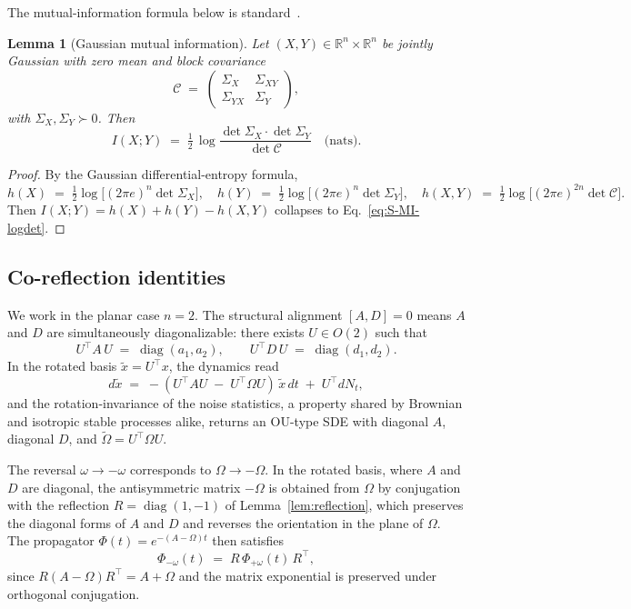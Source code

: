 \documentclass[%
 reprint,
 superscriptaddress,
 nofootinbib,
 nobibnotes,
 amsmath,amssymb,
 aps,
 prl,
 floatfix,
]{revtex4-2}
\newcommand{\RR}{\mathbb{R}}
\DeclareMathOperator{\diag}{diag}
\newtheorem{lemma}{Lemma}
\begin{document}
The mutual-information formula below is standard~\cite{Shannon1948,CoverThomas2006}.

\begin{lemma}[Gaussian mutual information]\label{lem:gaussian-MI}
Let $(X, Y) \in \RR^n \times \RR^n$ be jointly Gaussian with zero mean and block covariance
\[
\mathcal C \;=\; \begin{pmatrix} \Sigma_X & \Sigma_{XY} \\ \Sigma_{YX} & \Sigma_Y \end{pmatrix},
\]
with $\Sigma_X, \Sigma_Y \succ 0$. Then
\begin{equation}\label{eq:S-MI-logdet}
I(X; Y) \;=\; \tfrac{1}{2}\,\log\!\frac{\det \Sigma_X \cdot \det \Sigma_Y}{\det \mathcal C} \quad \text{(nats)}.
\end{equation}
\end{lemma}
\begin{proof}
By the Gaussian differential-entropy formula,
\[
h(X) \;=\; \tfrac{1}{2}\log\bigl[(2\pi e)^n \det \Sigma_X\bigr], \quad
h(Y) \;=\; \tfrac{1}{2}\log\bigl[(2\pi e)^n \det \Sigma_Y\bigr], \quad
h(X,Y) \;=\; \tfrac{1}{2}\log\bigl[(2\pi e)^{2n} \det \mathcal C\bigr].
\]
Then $I(X;Y) = h(X) + h(Y) - h(X,Y)$ collapses to Eq.~\eqref{eq:S-MI-logdet}.
\end{proof}

\subsection{Co-reflection identities}\label{app:co-reflect}

We work in the planar case $n=2$. The structural alignment $[A,D] = 0$ means $A$ and $D$ are simultaneously diagonalizable: there exists $U \in O(2)$ such that
\[
U^\top A\,U \;=\; \diag(a_1, a_2), \qquad U^\top D\,U \;=\; \diag(d_1, d_2).
\]
In the rotated basis $\tilde x = U^\top x$, the dynamics read
\[
d\tilde x \;=\; -(U^\top A U \;-\; U^\top \Omega U)\,\tilde x\,dt \;+\; U^\top dN_t,
\]
and the rotation-invariance of the noise statistics, a property shared by Brownian and isotropic stable processes alike, returns an OU-type SDE with diagonal $A$, diagonal $D$, and $\tilde \Omega = U^\top \Omega U$.

The reversal $\omega \to -\omega$ corresponds to $\Omega \to -\Omega$. In the rotated basis, where $A$ and $D$ are diagonal, the antisymmetric matrix $-\Omega$ is obtained from $\Omega$ by conjugation with the reflection $R = \diag(1, -1)$ of Lemma~\ref{lem:reflection}, which preserves the diagonal forms of $A$ and $D$ and reverses the orientation in the plane of $\Omega$. The propagator $\Phi(t) = e^{-(A - \Omega) t}$ then satisfies
\begin{equation}\label{eq:S-Phi-conjugate}
\Phi_{-\omega}(t) \;=\; R\,\Phi_{+\omega}(t)\,R^\top,
\end{equation}
since $R(A - \Omega)R^\top = A + \Omega$ and the matrix exponential is preserved under orthogonal conjugation.
\end{document}
